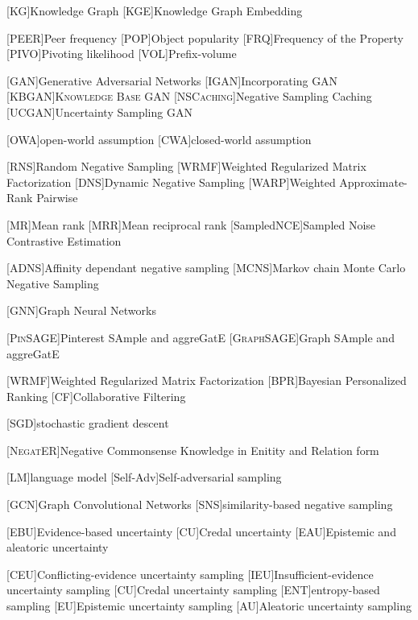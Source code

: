 \begin{acronym}[ECU]

[KG]{Knowledge Graph}
[KGE]{Knowledge Graph Embedding}

[\textsc{PEER}]{Peer frequency}
[\textsc{POP}]{Object popularity }
[\textsc{FRQ}]{Frequency of the Property}
[\textsc{PIVO}]{Pivoting likelihood}
[\textsc{VOL}]{Prefix-volume}

[GAN]{Generative Adversarial Networks}
[\textsc{IGAN}]{Incorporating GAN}
[\textsc{KBGAN}]{\textsc{Knowledge Base GAN}}
[\textsc{NSCaching}]{Negative Sampling Caching}
[\textsc{UCGAN}]{Uncertainty Sampling GAN}

[OWA]{open-world assumption}
[CWA]{closed-world assumption}

[RNS]{Random Negative Sampling}
[WRMF]{Weighted Regularized Matrix Factorization}
[DNS]{Dynamic Negative Sampling}
[WARP]{Weighted Approximate-Rank Pairwise}

[MR]{Mean rank}
[MRR]{Mean reciprocal rank}
[SampledNCE]{Sampled Noise Contrastive Estimation}

[\textsc{ADNS}]{Affinity dependant negative sampling}
[\textsc{MCNS}]{Markov chain Monte Carlo Negative Sampling}
    
[GNN]{Graph Neural Networks}

[\textsc{PinSAGE}]{Pinterest SAmple and aggreGatE}
[\textsc{GraphSAGE}]{Graph SAmple and aggreGatE}


[WRMF]{Weighted Regularized Matrix Factorization}
[BPR]{Bayesian Personalized Ranking}
[CF]{Collaborative Filtering}

[SGD]{stochastic gradient descent}

[\textsc{NegatER}]{Negative Commonsense Knowledge in Enitity and Relation form}

[LM]{language model}
[Self-Adv]{Self-adversarial sampling}

[GCN]{Graph Convolutional Networks}
[SNS]{similarity-based negative sampling}


[EBU]{Evidence-based uncertainty}
[CU]{Credal uncertainty}
[EAU]{Epistemic and aleatoric uncertainty}

[CEU]{Conflicting-evidence uncertainty sampling}
[IEU]{Insufficient-evidence uncertainty sampling}
[CU]{Credal uncertainty sampling}
[ENT]{entropy-based sampling}
[EU]{Epistemic uncertainty sampling}
[AU]{Aleatoric uncertainty sampling}
    
\end{acronym}